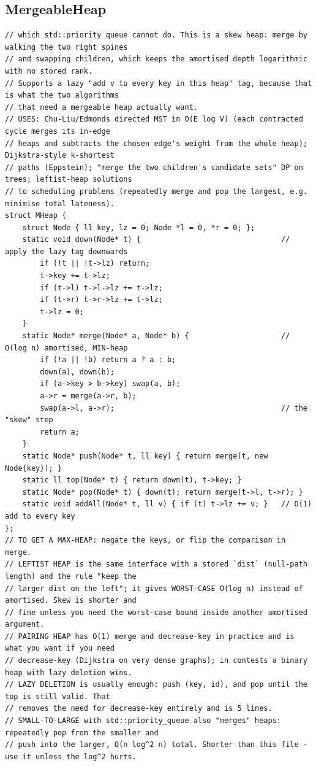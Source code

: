 \documentclass[9pt,a4paper,twocolumn]{extarticle}
\begin{document}
\filbreak
\subsection{MergeableHeap}
\nopagebreak
\begin{lstlisting}
// which std::priority_queue cannot do. This is a skew heap: merge by walking the two right spines
// and swapping children, which keeps the amortised depth logarithmic with no stored rank.
// Supports a lazy "add v to every key in this heap" tag, because that is what the two algorithms
// that need a mergeable heap actually want.
// USES: Chu-Liu/Edmonds directed MST in O(E log V) (each contracted cycle merges its in-edge
// heaps and subtracts the chosen edge's weight from the whole heap); Dijkstra-style k-shortest
// paths (Eppstein); "merge the two children's candidate sets" DP on trees; leftist-heap solutions
// to scheduling problems (repeatedly merge and pop the largest, e.g. minimise total lateness).
struct MHeap {
    struct Node { ll key, lz = 0; Node *l = 0, *r = 0; };
    static void down(Node* t) {                                // apply the lazy tag downwards
        if (!t || !t->lz) return;
        t->key += t->lz;
        if (t->l) t->l->lz += t->lz;
        if (t->r) t->r->lz += t->lz;
        t->lz = 0;
    }
    static Node* merge(Node* a, Node* b) {                     // O(log n) amortised, MIN-heap
        if (!a || !b) return a ? a : b;
        down(a), down(b);
        if (a->key > b->key) swap(a, b);
        a->r = merge(a->r, b);
        swap(a->l, a->r);                                      // the "skew" step
        return a;
    }
    static Node* push(Node* t, ll key) { return merge(t, new Node{key}); }
    static ll top(Node* t) { return down(t), t->key; }
    static Node* pop(Node* t) { down(t); return merge(t->l, t->r); }
    static void addAll(Node* t, ll v) { if (t) t->lz += v; }   // O(1) add to every key
};
// TO GET A MAX-HEAP: negate the keys, or flip the comparison in merge.
// LEFTIST HEAP is the same interface with a stored `dist` (null-path length) and the rule "keep the
// larger dist on the left"; it gives WORST-CASE O(log n) instead of amortised. Skew is shorter and
// fine unless you need the worst-case bound inside another amortised argument.
// PAIRING HEAP has O(1) merge and decrease-key in practice and is what you want if you need
// decrease-key (Dijkstra on very dense graphs); in contests a binary heap with lazy deletion wins.
// LAZY DELETION is usually enough: push (key, id), and pop until the top is still valid. That
// removes the need for decrease-key entirely and is 5 lines.
// SMALL-TO-LARGE with std::priority_queue also "merges" heaps: repeatedly pop from the smaller and
// push into the larger, O(n log^2 n) total. Shorter than this file - use it unless the log^2 hurts.
\end{lstlisting}
\end{document}
